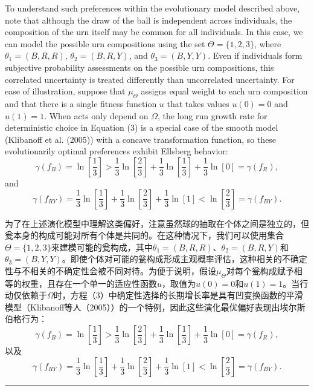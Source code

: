 \documentclass[12pt,a4paper]{article}
\newenvironment{original}
  {\par\noindent\color{black}\smallskip}
  {\par\smallskip}
\newenvironment{translation}
  {\par\noindent\color{blue!70!black}\smallskip}
  {\par\medskip\hrule\medskip}
\begin{document}
\begin{original}
To understand such preferences within the evolutionary model described above, note that although the draw of the ball is independent across individuals, the composition of the urn itself may be common for all individuals. In this case, we can model the possible urn compositions using the set $\Theta = \{1, 2, 3\}$, where $\theta_1 = (B, R, R)$, $\theta_2 = (B, R, Y)$, and $\theta_3 = (B, Y, Y)$. Even if individuals form subjective probability assessments on the possible urn compositions, this correlated uncertainty is treated differently than uncorrelated uncertainty. For ease of illustration, suppose that $\mu_\Theta$ assigns equal weight to each urn composition and that there is a single fitness function $u$ that takes values $u(0) = 0$ and $u(1) = 1$. When acts only depend on $\Omega$, the long run growth rate for deterministic choice in Equation (3) is a special case of the smooth model (Klibanoff et al. (2005)) with a concave transformation function, so these evolutionarily optimal preferences exhibit Ellsberg behavior:
\[
\gamma(f_B) = \ln\left[\frac{1}{3}\right] > \frac{1}{3}\ln\left[\frac{2}{3}\right] + \frac{1}{3}\ln\left[\frac{1}{3}\right] + \frac{1}{3}\ln[0] = \gamma(f_R),
\]
and
\[
\gamma(f_{RY}) = \frac{1}{3}\ln\left[\frac{1}{3}\right] + \frac{1}{3}\ln\left[\frac{2}{3}\right] + \frac{1}{3}\ln[1] < \ln\left[\frac{2}{3}\right] = \gamma(f_{BY}).
\]
\end{original}
\begin{translation}
为了在上述演化模型中理解这类偏好，注意虽然球的抽取在个体之间是独立的，但瓮本身的构成可能对所有个体是共同的。在这种情况下，我们可以使用集合$\Theta = \{1, 2, 3\}$来建模可能的瓮构成，其中$\theta_1 = (B, R, R)$、$\theta_2 = (B, R, Y)$和$\theta_3 = (B, Y, Y)$。即使个体对可能的瓮构成形成主观概率评估，这种相关的不确定性与不相关的不确定性会被不同对待。为便于说明，假设$\mu_\Theta$对每个瓮构成赋予相等的权重，且存在一个单一的适应性函数$u$，取值为$u(0) = 0$和$u(1) = 1$。当行动仅依赖于$\Omega$时，方程（3）中确定性选择的长期增长率是具有凹变换函数的平滑模型（Klibanoff等人（2005））的一个特例，因此这些演化最优偏好表现出埃尔斯伯格行为：
\[
\gamma(f_B) = \ln\left[\frac{1}{3}\right] > \frac{1}{3}\ln\left[\frac{2}{3}\right] + \frac{1}{3}\ln\left[\frac{1}{3}\right] + \frac{1}{3}\ln[0] = \gamma(f_R),
\]
以及
\[
\gamma(f_{RY}) = \frac{1}{3}\ln\left[\frac{1}{3}\right] + \frac{1}{3}\ln\left[\frac{2}{3}\right] + \frac{1}{3}\ln[1] < \ln\left[\frac{2}{3}\right] = \gamma(f_{BY}).
\]
\end{translation}
\end{document}
